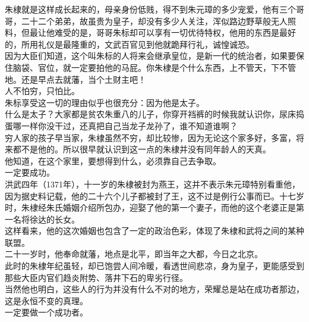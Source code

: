 \begin{multicols}{\theparacolNo}
朱棣就是这样成长起来的，母亲身份低贱，得不到朱元璋的多少宠爱，他有三个哥哥，二十二个弟弟，故虽贵为皇子，却没有多少人关注，浑似路边野草般无人照料，但最让他难受的是，哥哥朱标却可以享有一切优待特权，他用的东西是最好的，所用礼仪是最隆重的，文武百官见到他就跪拜行礼，诚惶诚恐。\\

因为大臣们知道，这个叫朱标的人将来会继承皇位，是新一代的统治者，如果要保住脑袋、官位，就一定要拍他的马屁。你朱棣是个什么东西，上不管天，下不管地。还是早点去就藩，当个土财主吧！\\

人不怕穷，只怕比。\\

朱标享受这一切的理由似乎也很充分：因为他是太子。\\

什么是太子？大家都是贫农朱重八的儿子，你穿开裆裤的时候我就认识你，尿床捣蛋哪一样你没干过，还真把自己当龙子龙孙了，谁不知道谁啊？\\

穷人家的孩子早当家，朱棣虽然不穷，却比较惨，因为无论这个家多好，多富，将来都不是他的。所以很早就认识到这一点的朱棣并没有同年龄人的天真。\\

他知道，在这个家里，要想得到什么，必须靠自己去争取。\\

一定要成功。\\

洪武四年（1371年），十一岁的朱棣被封为燕王，这并不表示朱元璋特别看重他，因为据史料记载，他的二十六个儿子都被封了王，这不过是例行公事而已。十七岁时，朱棣经朱氏婚姻介绍所包办，迎娶了他的第一个妻子，而他的这个老婆正是第一名将徐达的长女。\\

这样看来，他的这次婚姻也包含了一定的政治色彩，体现了朱棣和武将之间的某种联盟。\\

二十一岁时，他奉命就藩，地点是北平，即当年之大都，今日之北京。\\

此时的朱棣年纪虽轻，却已饱尝人间冷暖，看透世间悲凉，身为皇子，更能感受到那些大臣内官们趋炎附势、落井下石的卑劣行径。\\

当然他也明白，这些人的行为并没有什么不对的地方，荣耀总是站在成功者那边，这是永恒不变的真理。\\

一定要做一个成功者。\\


\end{multicols}
